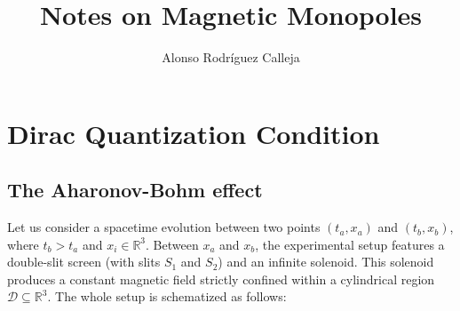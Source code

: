 \documentclass[a4paper,11pt]{article}
\title{\boldmath Notes on Magnetic Monopoles}
\author[]{Alonso Rodríguez Calleja}
\affiliation[a]{Universidad de Valencia}
\begin{document}
 
\maketitle
\flushbottom

\section{Dirac Quantization Condition}
\subsection{The Aharonov-Bohm effect}
Let us consider a spacetime evolution between two points $(t_a, x_a)$ and $(t_b, x_b)$, where $t_b > t_a$ and $x_i \in \mathbb{R}^3$. Between $x_a$ and $x_b$, the experimental setup features a double-slit screen (with slits $S_1$ and $S_2$) and an infinite solenoid. This solenoid produces a constant magnetic field strictly confined within a cylindrical region $\mathcal{D} \subseteq \mathbb{R}^3$. The whole setup is schematized as follows:
\end{document}
